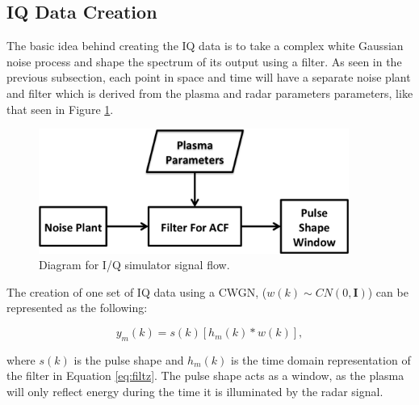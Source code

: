\documentclass[draft,ras]{agutex}
\begin{document}
\begin{article}
\subsection{ IQ Data Creation}
The basic idea behind creating the IQ data is to take a complex white Gaussian noise process and shape the spectrum of its output using a filter. As seen in the previous subsection, each point in space and time will have a separate noise plant and filter which is derived from the plasma and radar parameters parameters, like that seen in Figure \ref{fig:IQdiagram}. 

\begin{figure}[h!]
\centering
\includegraphics[width=4in]{diagrampart}
\caption{Diagram for I/Q simulator signal flow.}
\label{fig:IQdiagram}
\end{figure}

The creation of one set of IQ data using a CWGN, ($w(k)\sim CN(0,\mathbf{I})$) can be represented as the following:   

\begin{equation}
\label{eq2}
y_m (k)= s(k)\left[h_m(k)*w(k)\right],
\end{equation}
 
\noindent where $s(k)$ is the pulse shape and $h_m(k)$ is the time domain representation of the filter in Equation \ref{eq:filtz}. The pulse shape acts as a window, as the plasma will only reflect energy during the time it is illuminated by the radar signal. 


%


\end{article}
\end{document}
